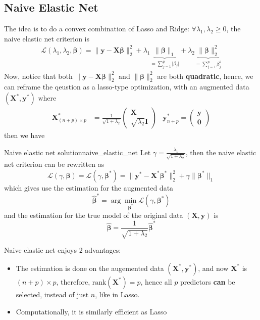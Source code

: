 \documentclass[twoside]{article}
\begin{document}
\subsection{Naive Elastic Net}
The idea is to do a convex combination of Lasso and Ridge: $\forall \lambda_1,\lambda_2 \geq 0$, the naive elastic net criterion is
\begin{align*}
    \mathcal{L}(\lambda_1,\lambda_2,\boldsymbol{\beta}) = \lVert \mathbf{y}-\mathbf{X}\boldsymbol{\beta} \rVert _2^2 + \lambda_1 \underbrace{\lVert \boldsymbol{\beta} \rVert _1}_{=\sum^p_{j=1}\lvert \beta_j \rvert} + \lambda_2 \underbrace{\lVert \boldsymbol{\beta} \rVert^2_2}_{=\sum^p_{j=1} \beta_j^2}
\end{align*}
Now, notice that both $\lVert \mathbf{y}-\mathbf{X}\boldsymbol{\beta} \rVert _2^2$ and $\lVert \boldsymbol{\beta} \rVert^2_2$ are both \textbf{quadratic}, hence, we can reframe the qeustion as a lasso-type optimization, with an augmented data $(\mathbf{X}^*,\mathbf{y}^*)$ where 
\begin{align*}
    \mathbf{X}^*_{(n+p)\times p} &= \frac{1}{\sqrt{1+\lambda_2}} \begin{pmatrix} \mathbf{X} \\ \sqrt{\lambda_2}\mathbf{I} \end{pmatrix} & \mathbf{y}^*_{n+p} =  \begin{pmatrix} \mathbf{y} \\ \mathbf{0} \end{pmatrix}
\end{align*}
then we have 
\begin{definition}{Naive elastic net solution}{naive_elastic_net}
    Let $\gamma = \frac{\lambda_1}{\sqrt{1+\lambda_2}}$, then the naive elastic net criterion can be rewritten as
    $$
    \mathcal{L}(\gamma,\boldsymbol{\beta}) = \mathcal{L}(\gamma,\boldsymbol{\beta}^*) = \lVert \mathbf{y}^*-\mathbf{X}^*\boldsymbol{\beta}^* \rVert _2^2 + \gamma \lVert \boldsymbol{\beta}^* \rVert _1 
    $$
    which gives use the estimation for the augmented data
    $$
    \hat{\boldsymbol{\beta}}^* = \arg\min_{\boldsymbol{\beta}^*} \mathcal{L}(\gamma,\boldsymbol{\beta}^*)
    $$
    and the estimation for the true model of the original data $(\mathbf{X},\mathbf{y})$ is 
    $$
    \hat{\boldsymbol{\beta}} = \frac{1}{\sqrt{1+\lambda_2}}\hat{\boldsymbol{\beta}}^*
    $$
\end{definition}
Naive elastic net enjoys 2 advantages:
\begin{itemize}
    \item The estimation is done on the augemented data $(\mathbf{X}^*,\mathbf{y}^*)$, and now $\mathbf{X}^*$ is $(n+p)\times p$, therefore, $\mathrm{rank}(\mathbf{X}^*)=p$, hence all $p$ predictors \textbf{can} be selected, instead of just $n$, like in Lasso.
    \item Computationally, it is similarly efficient as Lasso
\end{itemize}
\end{document}
